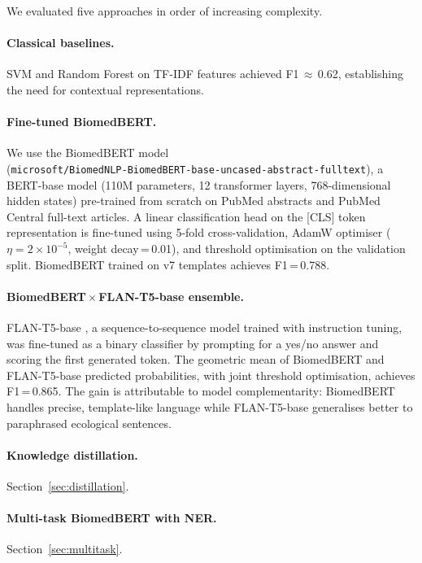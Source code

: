\documentclass[12pt,a4paper]{article}
\begin{document}
We evaluated five approaches in order of increasing complexity.

\paragraph{Classical baselines.}
SVM and Random Forest on TF-IDF features achieved F1\,$\approx$\,0.62,
establishing the need for contextual representations.

\paragraph{Fine-tuned BiomedBERT.}
We use the BiomedBERT model \citep{gu2021domain}\\
(\texttt{microsoft/BiomedNLP-BiomedBERT-base-uncased-abstract-fulltext}),
a BERT-base model (110M parameters, 12 transformer
layers, 768-dimensional hidden states) pre-trained from scratch on PubMed
abstracts and PubMed Central full-text articles. A linear classification
head on the [CLS] token representation is fine-tuned using 5-fold
cross-validation, AdamW optimiser ($\eta = 2 \times 10^{-5}$, weight
decay\,=\,0.01), and threshold optimisation on the validation split.
BiomedBERT trained on v7 templates achieves F1\,=\,0.788.

\paragraph{BiomedBERT\,$\times$\,FLAN-T5-base ensemble.}
FLAN-T5-base \citep{chung2022scaling}, a sequence-to-sequence model trained
with instruction tuning, was fine-tuned as a binary classifier by prompting
for a yes/no answer and scoring the first generated token. The geometric
mean of BiomedBERT and FLAN-T5-base predicted probabilities, with joint
threshold optimisation, achieves F1\,=\,0.865. The gain is attributable to
model complementarity: BiomedBERT handles precise, template-like language
while FLAN-T5-base generalises better to paraphrased ecological sentences.

\paragraph{Knowledge distillation.}
Section~\ref{sec:distillation}.

\paragraph{Multi-task BiomedBERT with NER.}
Section~\ref{sec:multitask}.
\end{document}
